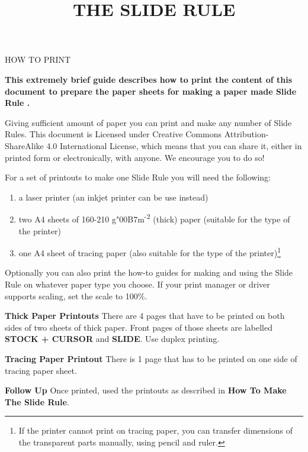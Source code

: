 
\newcommand{\makefulltitle}{How To Print The Slide Rule }



\title{\fontsize{60}{60}\selectfont THE SLIDE RULE}
\preauthor{}\postauthor{}\author{}
\predate{}\postdate{}\date{}


  \begin{center}
    \headingfont\fontsize{20}{20}\selectfont HOW TO PRINT
  \end{center}

  {\let\newpage\relax\maketitle}%
  \nosection{}
  \large\textbf{\makeperex This extremely brief guide describes how to print the content of this document to prepare the paper sheets for making a paper made Slide Rule \modelname.}

  \begin{multicols*}{3}
  \normalsize{

  Giving sufficient amount of paper you can print and make any number of Slide Rules. This document is Licensed under Creative Commons Attribution-ShareAlike 4.0 International License, which means that you can share it, either in printed form or electronically, with anyone. We encourage you to do so!

  For a set of printouts to make one Slide Rule you will need the following:
    \begin{enumerate}
      \setlength{\parskip}{0pt}
      \setlength{\parsep}{0pt}
      \item a laser printer (an inkjet printer can be use instead)
      \item two A4 sheets of 160-210 g{\char"00B7}m\textsuperscript{-2} (thick) paper (suitable for the type of the printer)
      \item one A4 sheet of tracing paper (also suitable for the type of the printer)\footnote{If the printer cannot print on tracing paper, you can transfer dimensions of the transparent parts manually, using pencil and ruler.}
    \end{enumerate}

  Optionally you can also print the how-to guides for making and using the Slide Rule on whatever paper type you choose. If your print manager or driver supports scaling, set the scale to 100\%.

  \textbf{Thick Paper Printouts}
There are 4 pages that have to be printed on both sides of two sheets of thick paper. Front pages of those sheets are labelled \textbf{STOCK + CURSOR} and \textbf{SLIDE}. Use duplex printing.

  \textbf{Tracing Paper Printout}
There is 1 page that has to be printed on one side of tracing paper sheet. 

  \textbf{Follow Up}
Once printed, used the printouts as described in \textbf{How To Make The Slide Rule}.

  }
  \end{multicols*}
  

